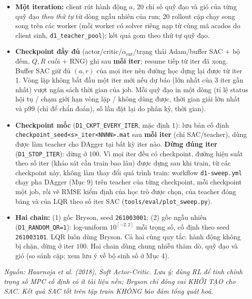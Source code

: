 \documentclass[11pt]{article}
\begin{document}
\begin{itemize}[leftmargin=1.4em,itemsep=1pt]
thay đổi lệnh giữa hai bước; $r_{\mathrm{viol}}$ là tỉ lệ bước có $|\phi|$ hoặc $|\theta|>1.35$ rad;
$r_{\mathrm{fail}}$ là tỉ lệ bước có lời giải teacher \textbf{không dùng được} (status $\notin\{0,2\}$
hoặc $\delta u_0$ không hữu hạn) --- cùng định nghĩa với luật áp dụng (Mục 7). Reward \emph{không} có thành
phần vận tốc. Theo quy tắc bay chung (Mục 4.1), quỹ đạo luôn bay đủ $979$ bước; bước phân kỳ tính sai số $5$ m và
một lần vi phạm tư thế, rồi bản sao plant được đặt lại trên tham chiếu. Reward được tính trên plant có gió.
\item \textbf{Một iteration:} client rút hành động $a$, 20 chỉ số quỹ đạo và gió của từng quỹ đạo \emph{theo thứ
tự} từ dòng ngẫu nhiên của run; 20 rollout cặp chạy song song trên các worker (mỗi worker có solver riêng nạp
từ cùng mã acados do client sinh, \texttt{d1\_teacher\_pool}); kết quả gom theo thứ tự quỹ đạo.
\item \textbf{Checkpoint đầy đủ} (actor/critic/$\alpha_{\mathrm{ent}}$/trạng thái Adam/buffer SAC $+$ bộ đếm,
$Q,R$ cuối $+$ RNG) ghi sau \textbf{mỗi iter}; resume tiếp từ iter đã xong. Buffer SAC giữ đủ $(a,r)$ của mọi
iter nên đường học dựng lại được từ iter 1. Vòng lặp không bắt đầu một iter mới nếu dự báo (lớn nhất của 3 iter
gần nhất) vượt ngân sách thời gian của job. Mỗi quỹ đạo in một dòng (tỉ lệ status hội tụ / chạm giới hạn vòng
lặp / không dùng được, thời gian giải lớn nhất và p99 (chỉ để chẩn đoán), số lần đặt lại do phân kỳ, thời gian).
\item \textbf{Checkpoint mốc} (\texttt{D1\_\allowbreak CKPT\_\allowbreak EVERY\_\allowbreak ITER}, mặc định $1$): lưu bản cố định
\texttt{checkpoint\_\allowbreak seed<s>\_\allowbreak iter<NNNN>.mat} sau \textbf{mỗi iter} (chỉ SAC/teacher), dùng được làm teacher
cho DAgger tại bất kỳ iter nào. \textbf{Dừng đúng iter} (\texttt{D1\_STOP\_ITER}): dừng ở $100$. Vì mọi iter đều có
checkpoint, đường hiệu suất theo số iter (khảo sát cần train bao lâu) được dựng sau khi train, từ các checkpoint
này, không làm thay đổi quá trình train: workflow \texttt{d1-sweep.yml} chạy pha DAgger (Mục 9) trên teacher của
từng checkpoint, mỗi checkpoint một job, rồi vẽ RMSE kiểm định của học trò được chọn, của teacher đóng băng và
của LQR theo số iter SAC (\texttt{tools/eval/plot\_sweep.py}).
\item \textbf{Hai chain:} (1) gốc Bryson, seed \texttt{261003001}; (2) gốc ngẫu nhiên (\texttt{D1\_RANDOM\_QR=1}):
log-uniform $10^{[-2,2]}$ mỗi trọng số, cố định theo seed \texttt{261003101}. LQR luôn dùng Bryson. Cả hai cùng quy
tắc: hành động không bị chặn, dừng ở iter $100$. Hai chain dùng chung nhiễu thăm dò, quỹ đạo và gió (so sánh
cặp; xem lưu ý về bộ sinh số ở Mục 4).
\end{itemize}
{\small\itshape Nguồn: Haarnoja et al. (2018), Soft Actor-Critic. Lưu ý: dùng RL để tinh chỉnh trọng số
MPC cố định có ít tài liệu nền; Bryson chỉ đóng vai KHỞI TẠO cho SAC. Kết quả SAC tốt trên tập train
KHÔNG bảo đảm tổng quát hoá.}
\end{document}
